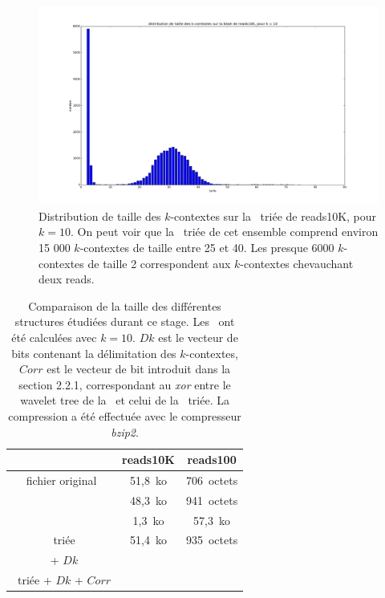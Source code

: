 \begin{figure}[!ht]
    \center
    \includegraphics[scale=0.3]{./images/distribReads10K_k10.png}
    \caption{Distribution de taille des $k$-contextes sur la \kbwt\ triée de reads10K, pour $k = 10$. On peut voir que la \kbwt\ triée de cet ensemble comprend environ 15 000 $k$-contextes de taille entre 25 et 40. Les presque 6000 $k$-contextes de taille 2 correspondent aux $k$-contextes chevauchant deux reads.}
    \label{tailleContextes}
\end{figure}

\begin{table}
\centering
\begin{tabular}{|c||c|c|}
	\cline{2-3}
	\multicolumn{1}{c|}{} & reads10K & reads100\\ \cline{2-3} \hline
	fichier original & 51,8~ko & 706~octets\\ \hline
	\bwt & 48,3~ko & 941~octets\\ \hline
	\kbwt & 1,3~ko & 57,3~ko \\ \hline
	\kbwt\ triée & 51,4~ko & 935~octets \\ \hline
	\kbwt\ + $Dk$ & & \\ \hline
	\kbwt\ triée + $Dk$ + $Corr$ & & \\ \hline
\end{tabular}
\caption{Comparaison de la taille des différentes structures étudiées durant ce stage. Les \kbwt\ ont été calculées avec $k=10$. $Dk$ est le vecteur de bits contenant la délimitation des $k$-contextes, $Corr$ est le vecteur de bit introduit dans la section 2.2.1, correspondant au \textit{xor} entre le wavelet tree de la \kbwt\ et celui de la \kbwt\ triée. La compression a été effectuée avec le compresseur \textit{bzip2}.}
\label{struct}
\end{table}

